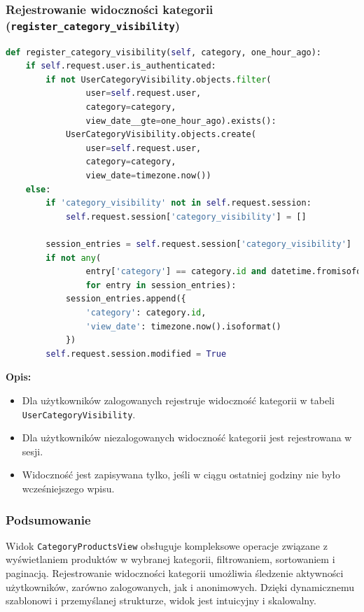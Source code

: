 \documentclass[12pt,a4paper,oneside]{article}
\theoremstyle{definition}
\numberwithin{equation}{section}
\begin{document}
\subsubsection*{Rejestrowanie widoczności kategorii (\texttt{register\_category\_visibility})}
\begin{lstlisting}[language=Python, caption=Funkcja \texttt{register\_category\_visibility}]
def register_category_visibility(self, category, one_hour_ago):
    if self.request.user.is_authenticated:
        if not UserCategoryVisibility.objects.filter(
                user=self.request.user,
                category=category,
                view_date__gte=one_hour_ago).exists():
            UserCategoryVisibility.objects.create(
                user=self.request.user,
                category=category,
                view_date=timezone.now())
    else:
        if 'category_visibility' not in self.request.session:
            self.request.session['category_visibility'] = []

        session_entries = self.request.session['category_visibility']
        if not any(
                entry['category'] == category.id and datetime.fromisoformat(entry['view_date']) >= one_hour_ago
                for entry in session_entries):
            session_entries.append({
                'category': category.id,
                'view_date': timezone.now().isoformat()
            })
        self.request.session.modified = True
\end{lstlisting}

\textbf{Opis:}
\begin{itemize}
    \item Dla użytkowników zalogowanych rejestruje widoczność
        \subsubitem kategorii w tabeli \texttt{UserCategoryVisibility}.
    \item Dla użytkowników niezalogowanych widoczność kategorii jest rejestrowana w sesji.
    \item Widoczność jest zapisywana tylko, jeśli w ciągu ostatniej godziny nie było wcześniejszego wpisu.
\end{itemize}


\subsubsection*{Podsumowanie}
Widok \texttt{CategoryProductsView} obsługuje kompleksowe operacje związane z wyświetlaniem produktów w wybranej kategorii, filtrowaniem, sortowaniem i paginacją. Rejestrowanie widoczności kategorii umożliwia śledzenie aktywności użytkowników, zarówno zalogowanych, jak i anonimowych. Dzięki dynamicznemu szablonowi i przemyślanej strukturze, widok jest intuicyjny i skalowalny.
\end{document}

